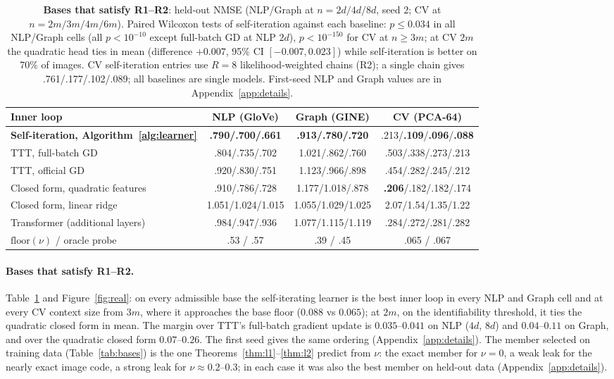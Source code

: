 \documentclass{article}
\theoremstyle{definition}
\theoremstyle{remark}
\newcommand{\flr}{\mathrm{floor}}
\begin{document}
\begin{table}[t]
\caption{\textbf{Bases that satisfy R1--R2}: held-out NMSE (NLP/Graph at $n=2d/4d/8d$, seed 2; CV at $n=2m/3m/4m/6m$). Paired Wilcoxon tests of self-iteration against each baseline: $p\leq0.034$ in all NLP/Graph cells (all $p<10^{-10}$ except full-batch GD at NLP $2d$), $p<10^{-150}$ for CV at $n\geq3m$; at CV $2m$ the quadratic head ties in mean (difference $+0.007$, 95\% CI $[-0.007,0.023]$) while self-iteration is better on 70\% of images. CV self-iteration entries use $R=8$ likelihood-weighted chains (R2); a single chain gives .761/.177/.102/.089; all baselines are single models. First-seed NLP and Graph values are in Appendix~\ref{app:details}.}
\label{tab:real}
\centering\small
\begin{tabular}{lccc}
\toprule
Inner loop & NLP (GloVe) & Graph (GINE) & CV (PCA-64)\\
\midrule
\textbf{Self-iteration, Algorithm~\ref{alg:learner}} & \textbf{.790/.700/.661} & \textbf{.913/.780/.720} & .213/\textbf{.109}/\textbf{.096}/\textbf{.088}\\
TTT, full-batch GD & .804/.735/.702 & 1.021/.862/.760 & .503/.338/.273/.213\\
TTT, official GD & .920/.830/.751 & 1.123/.966/.898 & .454/.282/.245/.212\\
Closed form, quadratic features & .910/.786/.728 & 1.177/1.018/.878 & \textbf{.206}/.182/.182/.174\\
Closed form, linear ridge & 1.051/1.024/1.015 & 1.055/1.029/1.025 & 2.07/1.54/1.35/1.22\\
Transformer (additional layers) & .984/.947/.936 & 1.077/1.115/1.119 & .284/.272/.281/.282\\
\midrule
$\flr(\nu)$ / oracle probe & .53 / .57 & .39 / .45 & .065 / .067\\
\bottomrule
\end{tabular}
\end{table}

\paragraph{Bases that satisfy R1--R2.}
Table~\ref{tab:real} and Figure~\ref{fig:real}: on every admissible base the self-iterating learner is the best inner loop in every NLP and Graph cell and at every CV context size from $3m$, where it approaches the base floor ($0.088$ vs $0.065$); at $2m$, on the identifiability threshold, it ties the quadratic closed form in mean.
The margin over TTT's full-batch gradient update is $0.035$--$0.041$ on NLP ($4d$, $8d$) and $0.04$--$0.11$ on Graph, and over the quadratic closed form $0.07$--$0.26$.
The first seed gives the same ordering (Appendix~\ref{app:details}).
The member selected on training data (Table~\ref{tab:bases}) is the one Theorems~\ref{thm:l1}--\ref{thm:l2} predict from $\nu$: the exact member for $\nu=0$, a weak leak for the nearly exact image code, a strong leak for $\nu\approx0.2$--$0.3$; in each case it was also the best member on held-out data (Appendix~\ref{app:details}).
\end{document}
